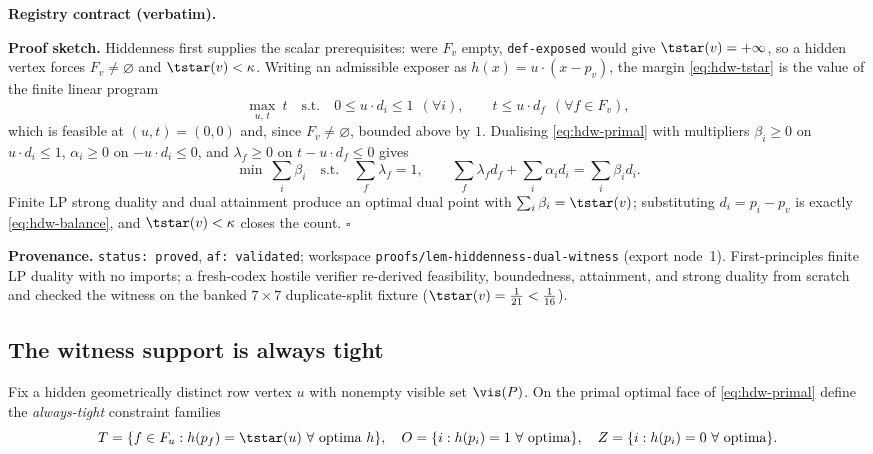 \noindent\textbf{Registry contract (verbatim).}

\noindent\textbf{Proof sketch.} Hiddenness first supplies the scalar prerequisites: were $F_v$ empty,
\texttt{def-exposed} would give $\tstar(v)=+\infty$, so a hidden vertex forces $F_v\neq\varnothing$ and
$\tstar(v)<\kappa$. Writing an admissible exposer as $h(x)=u\cdot(x-p_v)$, the margin
\eqref{eq:hdw-tstar} is the value of the finite linear program
\begin{equation}\label{eq:hdw-primal}
  \max_{u,\,t}\ t
  \quad\text{s.t.}\quad
  0\le u\cdot d_i\le1\ \ (\forall i),\qquad t\le u\cdot d_f\ \ (\forall f\in F_v),
\end{equation}
which is feasible at $(u,t)=(0,0)$ and, since $F_v\neq\varnothing$, bounded above by $1$. Dualising
\eqref{eq:hdw-primal} with multipliers $\beta_i\ge0$ on $u\cdot d_i\le1$, $\alpha_i\ge0$ on
$-u\cdot d_i\le0$, and $\lambda_f\ge0$ on $t-u\cdot d_f\le0$ gives
\[
  \min\ \sum_i\beta_i
  \quad\text{s.t.}\quad
  \sum_{f}\lambda_f=1,\qquad
  \sum_f\lambda_f d_f+\sum_i\alpha_i d_i=\sum_i\beta_i d_i .
\]
Finite LP strong duality and dual attainment produce an optimal dual point with
$\sum_i\beta_i=\tstar(v)$; substituting $d_i=p_i-p_v$ is exactly \eqref{eq:hdw-balance}, and
$\tstar(v)<\kappa$ closes the count. \hfill$\square$

\noindent\textbf{Provenance.} \texttt{status: proved}, \texttt{af: validated}; workspace
\texttt{proofs/lem-hiddenness-dual-witness} (export node~1). First-principles finite LP duality with
no imports; a fresh-codex hostile verifier re-derived feasibility, boundedness, attainment, and strong
duality from scratch and checked the witness on the banked $7\times7$ duplicate-split fixture
($\tstar(v)=\tfrac1{21}<\tfrac1{16}$).

\subsection{The witness support is always tight}

Fix a hidden geometrically distinct row vertex $u$ with nonempty visible set $\vis(P)$. On the primal
optimal face of \eqref{eq:hdw-primal} define the \emph{always-tight} constraint families
\[
  T=\{f\in F_u : h(p_f)=\tstar(u)\ \forall\text{ optima }h\},\quad
  O=\{i : h(p_i)=1\ \forall\text{ optima}\},\quad
  Z=\{i : h(p_i)=0\ \forall\text{ optima}\}.
\]


